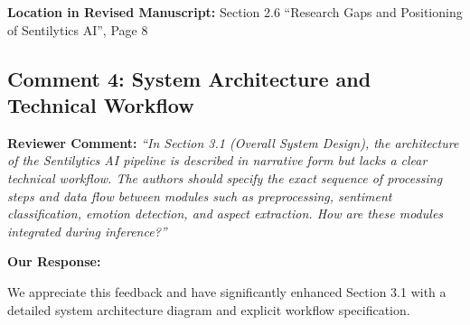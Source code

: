 \documentclass[11pt,a4paper]{article}
\begin{document}
\textbf{Location in Revised Manuscript:} Section 2.6 ``Research Gaps and Positioning of Sentilytics AI'', Page 8


\subsection*{Comment 4: System Architecture and Technical Workflow}

\textbf{Reviewer Comment:} \textit{``In Section 3.1 (Overall System Design), the architecture of the Sentilytics AI pipeline is described in narrative form but lacks a clear technical workflow. The authors should specify the exact sequence of processing steps and data flow between modules such as preprocessing, sentiment classification, emotion detection, and aspect extraction. How are these modules integrated during inference?''}

\vspace{6pt}

\textbf{Our Response:}

We appreciate this feedback and have significantly enhanced Section 3.1 with a detailed system architecture diagram and explicit workflow specification.
\end{document}
